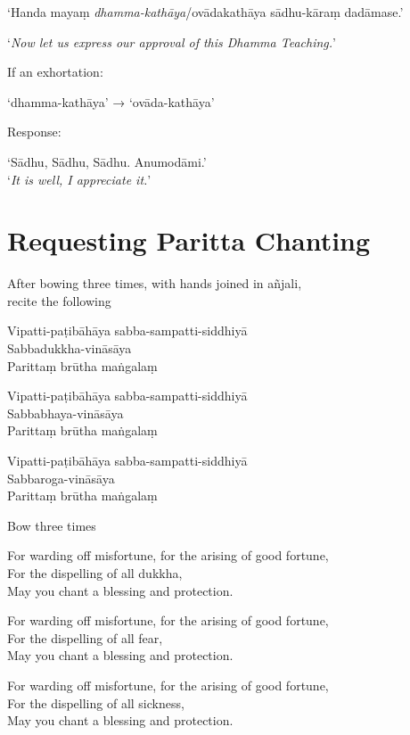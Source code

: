 ‘Handa mayaṃ \emph{dhamma-kathāya}/ovādakathāya sādhu-kāraṃ dadāmase.’

‘\emph{Now let us express our approval of this Dhamma Teaching.}’

If an exhortation:

‘dhamma-kathāya’ → ‘ovāda-kathāya’

Response:

‘Sādhu, Sādhu, Sādhu. Anumodāmi.’\\
‘\emph{It is well, I appreciate it.}’

\clearpage

\section{Requesting Paritta Chanting}

\begin{instruction}
  After bowing three times, with hands joined in añjali,\\
  recite the following
\end{instruction}

Vipatti-paṭibāhāya sabba-sampatti-siddhiyā\\
Sabbadukkha-vināsāya\\
Parittaṃ brūtha maṅgalaṃ

Vipatti-paṭibāhāya sabba-sampatti-siddhiyā\\
Sabbabhaya-vināsāya\\
Parittaṃ brūtha maṅgalaṃ

Vipatti-paṭibāhāya sabba-sampatti-siddhiyā\\
Sabbaroga-vināsāya\\
Parittaṃ brūtha maṅgalaṃ

\begin{instruction}
  Bow three times
\end{instruction}

\begin{english}
For warding off misfortune, for the arising of good fortune,\\
For the dispelling of all dukkha,\\
May you chant a blessing and protection.

For warding off misfortune, for the arising of good fortune,\\
For the dispelling of all fear,\\
May you chant a blessing and protection.

For warding off misfortune, for the arising of good fortune,\\
For the dispelling of all sickness,\\
May you chant a blessing and protection.
\end{english}

